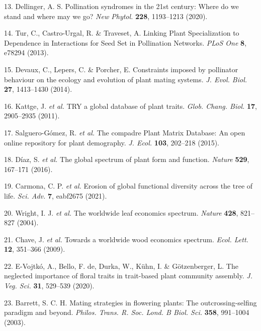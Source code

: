 \documentclass[
  12pt,
  a4paper,
]{article}
\begin{document}
\leavevmode\hypertarget{ref-dellinger2020}{}%
13. Dellinger, A. S. Pollination syndromes in the 21st century: Where do we stand and where may we go? \emph{New Phytol.} \textbf{228}, 1193--1213 (2020).

\leavevmode\hypertarget{ref-tur2013}{}%
14. Tur, C., Castro-Urgal, R. \& Traveset, A. Linking Plant Specialization to Dependence in Interactions for Seed Set in Pollination Networks. \emph{PLoS One} \textbf{8}, e78294 (2013).

\leavevmode\hypertarget{ref-devaux2014}{}%
15. Devaux, C., Lepers, C. \& Porcher, E. Constraints imposed by pollinator behaviour on the ecology and evolution of plant mating systems. \emph{J. Evol. Biol.} \textbf{27}, 1413--1430 (2014).

\leavevmode\hypertarget{ref-kattge2011}{}%
16. Kattge, J. \emph{et al.} TRY a global database of plant traits. \emph{Glob. Chang. Biol.} \textbf{17}, 2905--2935 (2011).

\leavevmode\hypertarget{ref-salguero2015}{}%
17. Salguero-Gómez, R. \emph{et al.} The compadre Plant Matrix Database: An open online repository for plant demography. \emph{J. Ecol.} \textbf{103}, 202--218 (2015).

\leavevmode\hypertarget{ref-diaz2016}{}%
18. Díaz, S. \emph{et al.} The global spectrum of plant form and function. \emph{Nature} \textbf{529}, 167--171 (2016).

\leavevmode\hypertarget{ref-carmona2021}{}%
19. Carmona, C. P. \emph{et al.} Erosion of global functional diversity across the tree of life. \emph{Sci. Adv.} \textbf{7}, eabf2675 (2021).

\leavevmode\hypertarget{ref-wright2004}{}%
20. Wright, I. J. \emph{et al.} The worldwide leaf economics spectrum. \emph{Nature} \textbf{428}, 821--827 (2004).

\leavevmode\hypertarget{ref-chave2009}{}%
21. Chave, J. \emph{et al.} Towards a worldwide wood economics spectrum. \emph{Ecol. Lett.} \textbf{12}, 351--366 (2009).

\leavevmode\hypertarget{ref-evojtko2020}{}%
22. E-Vojtkó, A., Bello, F. de, Durka, W., Kühn, I. \& Götzenberger, L. The neglected importance of floral traits in trait-based plant community assembly. \emph{J. Veg. Sci.} \textbf{31}, 529--539 (2020).

\leavevmode\hypertarget{ref-barrett2003}{}%
23. Barrett, S. C. H. Mating strategies in flowering plants: The outcrossing-selfing paradigm and beyond. \emph{Philos. Trans. R. Soc. Lond. B Biol. Sci.} \textbf{358}, 991--1004 (2003).
\end{document}
